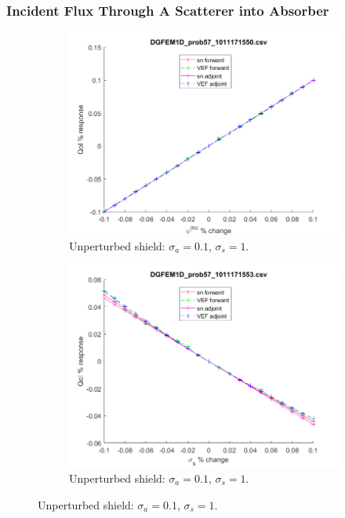 \documentclass[12pt]{report}
\newcommand{\sigs}{\sigma_s}
\newcommand{\siga}{\sigma_a}
\begin{document}
\subsubsection{Incident Flux Through A Scatterer into Absorber}

\begin{figure}[H]
\label{Scatterer}
\centering
\begin{subfigure}{.5\textwidth}
  \centering
  \includegraphics[width=.98\linewidth]{figures/57incSens.png}
  \caption{Unperturbed shield: $\siga=0.1$, $\sigs=1$. }
  \label{fig:sfig1}
\end{subfigure}%
\begin{subfigure}{.5\textwidth}
  \centering
  \includegraphics[width=.98\linewidth]{figures/57sigsSens.png}
  \caption{Unperturbed shield: $\siga=0.1$, $\sigs=1$. }
  \label{fig:sfig2}
\end{subfigure}
\end{figure}
\end{document}

